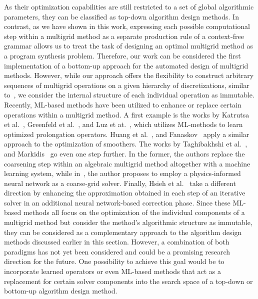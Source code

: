 As their optimization capabilities are still restricted to a set of global algorithmic parameters, they can be classified as top-down algorithm design methods.
In contrast, as we have shown in this work, expressing each possible computational step within a multigrid method as a separate production rule of a context-free grammar allows us to treat the task of designing an optimal multigrid method as a program synthesis problem.
Therefore, our work can be considered the first implementation of a bottom-up approach for the automated design of multigrid methods.
However, while our approach offers the flexibility to construct arbitrary sequences of multigrid operations on a given hierarchy of discretizations, similar to~\cite{oosterlee2003genetic,thekale2010optimizing,brown2021tuning}, we consider the internal structure of each individual operation as immutable.
Recently, ML-based methods have been utilized to enhance or replace certain operations within a multigrid method.
A first example is the works by Katrutsa et al.~\cite{katrutsa2020black}, Greenfeld et al.~\cite{greenfeld2019learning}, and Luz et at.~\cite{luz2020learning}, which utilizes ML-methods to learn optimized prolongation operators.
Huang et al.~\cite{huang2021learning}, and Fanaskov~\cite{fanaskov2021neural} apply a similar approach to the optimization of smoothers.
The works by Taghibakhshi et al.~\cite{taghibakhshi2021optimization}, and Markidis~\cite{markidis2021old} go even one step further.
In the former, the authors replace the coarsening step within an algebraic multigrid method altogether with a machine learning system, while in~\cite{markidis2021old}, the author proposes to employ a physics-informed neural network as a coarse-grid solver.
Finally, Hsieh et al.~\cite{hsieh2019learning} take a different direction by enhancing the approximation obtained in each step of an iterative solver in an additional neural network-based correction phase.
Since these ML-based methods all focus on the optimization of the individual components of a multigrid method but consider the method's algorithmic structure as immutable, they can be considered as a complementary approach to the algorithm design methods discussed earlier in this section.
However, a combination of both paradigms has not yet been considered and could be a promising research direction for the future.
One possibility to achieve this goal would be to incorporate learned operators or even ML-based methods that act as a replacement for certain solver components into the search space of a top-down or bottom-up algorithm design method.
